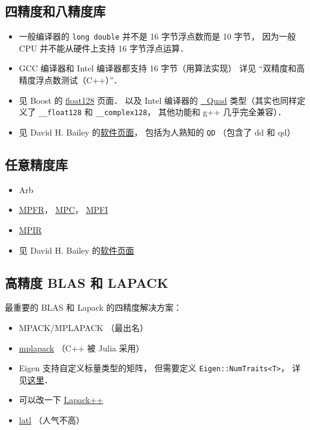 
\begin{issues}
\issueDraft
\end{issues}

\subsection{四精度和八精度库}
\begin{itemize}
\item 一般编译器的 \verb|long double| 并不是 16 字节浮点数而是 10 字节， 因为一般 CPU 并不能从硬件上支持 16 字节浮点运算．
\item GCC 编译器和 Intel 编译器都支持 16 字节（用算法实现） 详见 “双精度和高精度浮点数测试（C++）”．
\item 见 Boost 的 \href{https://www.boost.org/doc/libs/develop/libs/multiprecision/doc/html/boost_multiprecision/tut/floats/float128.html}{float128} 页面． 以及 Intel 编译器的 \href{https://community.intel.com/t5/Intel-C-Compiler/Quad-precision-Quad-data-type/td-p/1218636}{\_Quad} 类型（其实也同样定义了 \verb|__float128| 和 \verb|__complex128|， 其他功能和 g++ 几乎完全兼容）．
\item 见 David H. Bailey 的\href{https://www.davidhbailey.com/dhbsoftware/}{软件页面}， 包括为人熟知的 \verb|QD| （包含了 dd 和 qd）
\end{itemize}

\subsection{任意精度库}
\begin{itemize}
\item Arb
\item \href{https://www.mpfr.org/}{MPFR}， \href{https://www.multiprecision.org/mpc/}{MPC}， \href{http://perso.ens-lyon.fr/nathalie.revol/software.html}{MPFI}
\item \href{https://mpir.org/downloads.html}{MPIR}
\item 见 David H. Bailey 的\href{https://www.davidhbailey.com/dhbsoftware/}{软件页面}
\end{itemize}


\subsection{高精度 BLAS 和 LAPACK}
最重要的 BLAS 和 Lapack 的四精度解决方案：
\begin{itemize}
\item MPACK/MPLAPACK （最出名）
\item \href{https://github.com/nakatamaho/mplapack}{mplapack} （C++ 被 Julia 采用）
\item Eigen 支持自定义标量类型的矩阵， 但需要定义 \verb|Eigen::NumTraits<T>|， 详见\href{https://eigen.tuxfamily.org/dox/TopicCustomizing_CustomScalar.html}{这里}．
\item 可以改一下 \href{https://lapackpp.sourceforge.net/html/index.html}{Lapack++}
\item \href{https://github.com/langou/latl}{latl} （人气不高）
\end{itemize}
